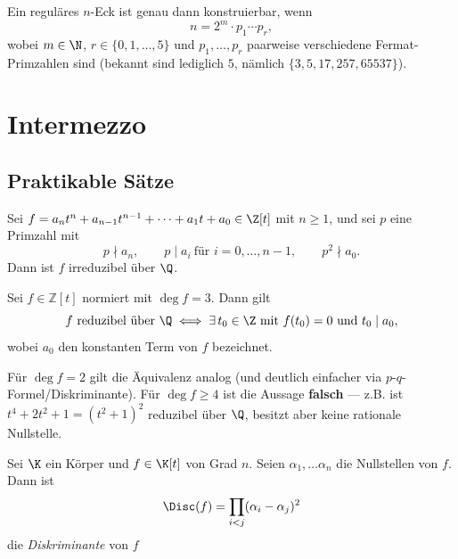 \documentclass[11pt, a4paper]{article}
\begin{document}
\begin{theorem}
\Theorem
Ein reguläres $n$-Eck ist genau dann konstruierbar, wenn
$$
n = 2^m \cdot p_1 \cdots p_r,
$$
wobei $m \in \N$, $r \in \{0,1,\dots,5\}$ und $p_1,\dots,p_r$ paarweise verschiedene Fermat-Primzahlen sind (bekannt sind lediglich $5$, nämlich $\{3,5,17,257,65537\}$).
\end{theorem}








\newpage
\section{Intermezzo}
\subsection{Praktikable Sätze}
\begin{theorem}
\Theorem
Sei $f = a_nt^n + a_{n-1}t^{n-1} + \dots + a_1t + a_0 \in \Z[t]$ mit $n \geq 1$, und sei $p$ eine Primzahl mit
$$
p \nmid a_n, \qquad p \mid a_i \ \text{für } i=0,\dots,n-1, \qquad p^2 \nmid a_0.
$$
Dann ist $f$ irreduzibel über $\Q$.
\end{theorem}

\begin{lemma} \Theorem
Sei $f \in \mathbb{Z}[t]$ normiert mit $\deg f = 3$. Dann gilt
$$f \text{ reduzibel über } \Q \iff \exists\, t_0 \in \Z \text{ mit } f(t_0) = 0 \text{ und } t_0 \mid a_0,$$
wobei $a_0$ den konstanten Term von $f$ bezeichnet.
\end{lemma}

\begin{note}Für $\deg f = 2$ gilt die Äquivalenz analog (und deutlich einfacher via $p$-$q$-Formel/Diskriminante). Für $\deg f \geq 4$ ist die Aussage \textbf{falsch} — z.B. ist $t^4 + 2t^2 + 1 = (t^2+1)^2$ reduzibel über $\Q$, besitzt aber keine rationale Nullstelle.
\end{note}



\begin{definition}[Diskriminante]
    Sei $\K$ ein Körper und $f\in \K[t]$ von Grad $n$. Seien $\alpha_1,\dots \alpha_n$ die Nullstellen von $f$. Dann ist 
    $$\Disc(f) = \prod_{i<j}(\alpha_i-\alpha_j)^2$$ 
    die \emph{Diskriminante} von $f$
\end{definition}
\end{document}
